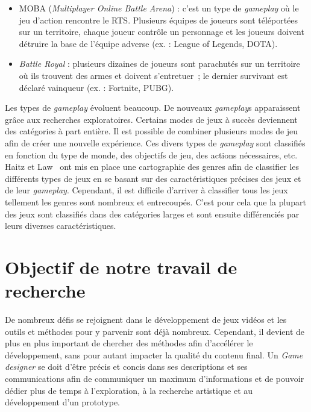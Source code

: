 \begin{itemize}
    \item MOBA (\emph{Multiplayer Online Battle Arena}) : c'est un type de \emph{gameplay} o\`u le jeu d'action rencontre le RTS. Plusieurs équipes de joueurs sont téléportées sur un territoire, chaque joueur contrôle un personnage et les joueurs doivent détruire la base de l'équipe adverse (ex. : League of Legends, DOTA).
    \item \emph{Battle Royal} : plusieurs dizaines de joueurs sont parachutés sur un territoire o\`u ils trouvent des armes et doivent s'entretuer~; le dernier survivant est déclaré vainqueur (ex. : Fortnite, PUBG).
\end{itemize}

Les types de \emph{gameplay} évoluent beaucoup. De nouveaux \emph{gameplay}s apparaissent grâce aux recherches exploratoires. Certains modes de jeux à succès deviennent des catégories à part entière. Il est possible de combiner plusieurs modes de jeu afin de créer une nouvelle expérience. Ces divers types de \emph{gameplay} sont classifiés en fonction du type de monde, des objectifs de jeu, des actions nécessaires, etc. Haitz et Law~\cite{HeintzStephanie2015TGGM} ont mis en place une cartographie des genres afin de classifier les différents types de jeux en se basant sur des caractéristiques précises des jeux et de leur \emph{gameplay}. Cependant, il est difficile d'arriver à classifier tous les jeux tellement les genres sont nombreux et entrecoupés. C'est pour cela que la plupart des jeux sont classifiés dans des catégories larges et sont ensuite différenciés par leurs diverses caractéristiques.



\section{Objectif de notre travail de recherche}





De nombreux d\'efis se rejoignent dans le développement de jeux vidéos et les outils et méthodes pour y parvenir sont déjà nombreux. Cependant, il devient de plus en plus important de chercher des méthodes afin d'accélérer le développement, sans pour autant impacter la qualité du contenu final. Un \emph{Game designer} se doit d'être précis et concis dans ses descriptions et ses communications afin de communiquer un maximum d'informations et de pouvoir dédier plus de temps à l'exploration, à la recherche artistique et au développement d'un prototype. 



